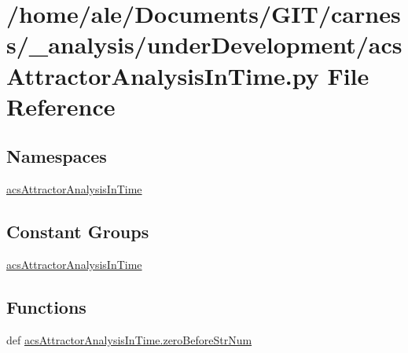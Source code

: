 \hypertarget{a00034}{\section{/home/ale/\-Documents/\-G\-I\-T/carness/\-\_\-analysis/under\-Development/acs\-Attractor\-Analysis\-In\-Time.py File Reference}
\label{a00034}
}
\subsection*{Namespaces}
\begin{DoxyCompactItemize}
\item 
\hyperlink{a00091}{acs\-Attractor\-Analysis\-In\-Time}
\end{DoxyCompactItemize}
\subsection*{Constant Groups}
\begin{DoxyCompactItemize}
\item 
\hyperlink{a00091}{acs\-Attractor\-Analysis\-In\-Time}
\end{DoxyCompactItemize}
\subsection*{Functions}
\begin{DoxyCompactItemize}
\item 
def \hyperlink{a00091_a52efd37e3719214b7a4c7c46842ae229}{acs\-Attractor\-Analysis\-In\-Time.\-zero\-Before\-Str\-Num}
\end{DoxyCompactItemize}
